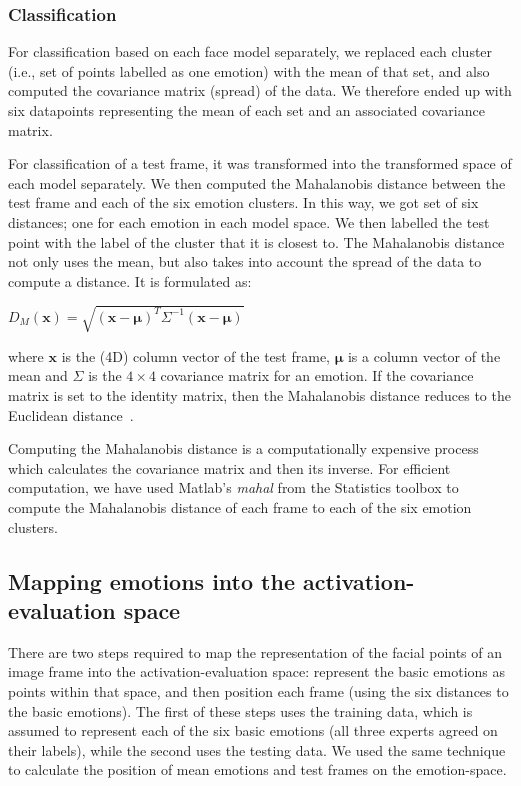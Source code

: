 \documentclass[10pt,journal,cspaper,compsoc]{IEEEtran}
\begin{document}
\subsubsection{Classification}

For classification based on each face model separately, we replaced each cluster (i.e., set of points labelled as one emotion) with the mean of that set, and also computed the covariance matrix (spread) of the data. We therefore ended up with six datapoints representing the mean of each set and an associated covariance matrix. 

For classification of a test frame, it was transformed into the transformed space of each model separately. We then computed the Mahalanobis distance between the test frame and each of the six emotion clusters. In this way, we got set of six distances; one for each emotion in each model space.
We then labelled the test point with the label of the cluster that it is closest to. The Mahalanobis distance not only uses the mean, but also takes into account the spread of the data to compute a distance. It is formulated as:

\begin{center}
$ D_{M}(\mathbf{x}) =\sqrt{(\mathbf{x}-\mathbf{\mu})^{T}\Sigma^{-1}(\mathbf{x}-\mathbf{\mu})} $
\end{center}

\noindent where $\mathbf{x}$ is the (4D) column vector of the test frame, $\mathbf{\mu}$ is a column vector of the mean and $\Sigma$ is the $4 \times 4$ covariance matrix for an emotion. If the covariance matrix is set to the identity matrix, then the Mahalanobis distance reduces to the Euclidean distance~\cite{Mahal1936, Marsland09}.

Computing the Mahalanobis distance is a computationally expensive process which calculates the covariance matrix and then its inverse. For efficient computation, we have used Matlab's \textit{mahal} from the Statistics toolbox to compute the Mahalanobis distance of each frame to each of the six emotion clusters. 

\subsection{Mapping emotions into the activation-evaluation space}
\label{sec_mapping}

There are two steps required to map the representation of the facial points of an image frame into the activation-evaluation space: represent the basic emotions as points within that space, and then position each frame (using the six distances to the basic emotions). The first of these steps uses the training data, which is assumed to represent each of the six basic emotions (all three experts agreed on their labels), while the second uses the testing data. We used the same technique to calculate the position of mean emotions and test frames on the emotion-space.
\end{document}
